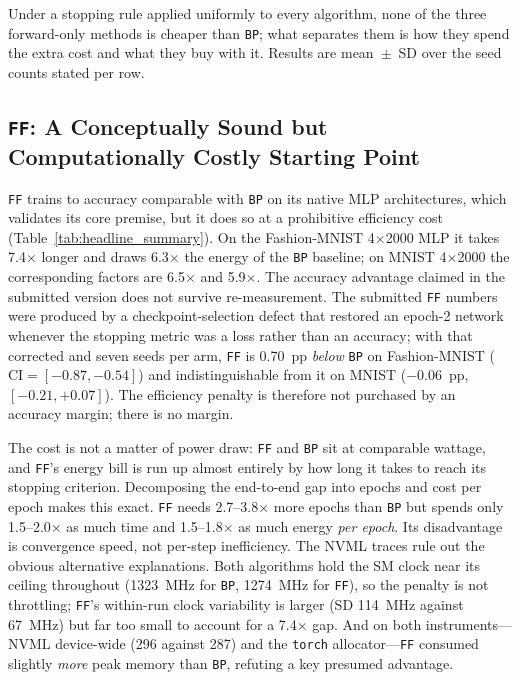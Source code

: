 \documentclass{llncs}
\newcommand{\FF}{\texttt{FF}}
\newcommand{\BP}{\texttt{BP}}
\begin{document}
Under a stopping rule applied uniformly to every algorithm, none of the three
forward-only methods is cheaper than \BP{}; what separates them is how they
spend the extra cost and what they buy with it. Results are mean~$\pm$~SD over
the seed counts stated per row.

\subsection{\FF{}: A Conceptually Sound but Computationally Costly
Starting Point}

{
\FF{} trains to accuracy comparable with \BP{} on its native MLP
architectures, which validates its core premise, but it does so at a
prohibitive efficiency cost (Table~\ref{tab:headline_summary}). On the
Fashion-MNIST 4$\times$2000 MLP it takes \num{7.4}$\times$ longer and
draws \num{6.3}$\times$ the energy of the \BP{} baseline; on MNIST
4$\times$2000 the corresponding factors are \num{6.5}$\times$ and
\num{5.9}$\times$. The accuracy advantage claimed in the submitted
version does not survive re-measurement. The submitted \FF{} numbers were
produced by a checkpoint-selection defect that restored an epoch-2
network whenever the stopping metric was a loss rather than an accuracy;
with that corrected and seven seeds per arm, \FF{} is \num{0.70}~pp
\emph{below} \BP{} on Fashion-MNIST
($\text{CI}=[-\num{0.87},-\num{0.54}]$) and indistinguishable from it on
MNIST ($-\num{0.06}$~pp, $[-\num{0.21},+\num{0.07}]$). The efficiency
penalty is therefore not purchased by an accuracy margin; there is no
margin.
\par}



The cost is not a matter of power draw: \FF{} and \BP{} sit at comparable
wattage, and \FF{}'s energy bill is run up almost entirely by how long it
takes to reach its stopping criterion. Decomposing the end-to-end gap into
epochs and cost per epoch makes this exact. \FF{} needs
\numrange{2.7}{3.8}$\times$ more epochs than \BP{} but spends only
\numrange{1.5}{2.0}$\times$ as much time and
\numrange{1.5}{1.8}$\times$ as much energy \emph{per epoch}. Its disadvantage
is convergence speed, not per-step inefficiency. The NVML traces rule out the
obvious alternative explanations. Both algorithms hold the SM clock near its
ceiling throughout (\SI{1323}{\mega\hertz} for \BP{},
\SI{1274}{\mega\hertz} for \FF{}), so the penalty is not throttling; \FF{}'s
within-run clock variability is larger (SD \SI{114}{\mega\hertz} against
\SI{67}{\mega\hertz}) but far too small to account for a \num{7.4}$\times$
gap. And on both instruments---NVML device-wide
(\SI{296}{\mebibyte} against \SI{287}{\mebibyte}) and the \texttt{torch}
allocator---\FF{} consumed slightly \emph{more} peak memory than \BP{},
refuting a key presumed advantage.
\end{document}
